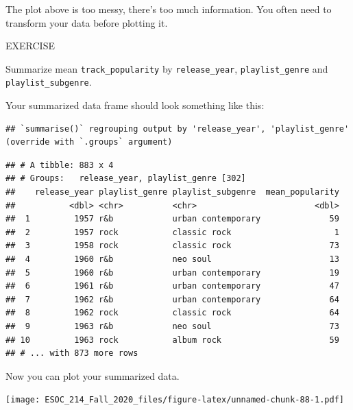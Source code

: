 \documentclass[
]{book}
\newenvironment{Shaded}{\begin{snugshade}}{\end{snugshade}}
\newcommand{\DataTypeTok}[1]{\textcolor[rgb]{0.13,0.29,0.53}{#1}}
\newcommand{\KeywordTok}[1]{\textcolor[rgb]{0.13,0.29,0.53}{\textbf{#1}}}
\newcommand{\NormalTok}[1]{#1}
\newcommand{\OperatorTok}[1]{\textcolor[rgb]{0.81,0.36,0.00}{\textbf{#1}}}
\newcommand{\StringTok}[1]{\textcolor[rgb]{0.31,0.60,0.02}{#1}}
\begin{document}
The plot above is too messy, there's too much information. You often need to transform your data before plotting it.

EXERCISE

Summarize mean \texttt{track\_popularity} by \texttt{release\_year}, \texttt{playlist\_genre} and \texttt{playlist\_subgenre}.

Your summarized data frame should look something like this:

\begin{verbatim}
## `summarise()` regrouping output by 'release_year', 'playlist_genre' (override with `.groups` argument)
\end{verbatim}

\begin{verbatim}
## # A tibble: 883 x 4
## # Groups:   release_year, playlist_genre [302]
##    release_year playlist_genre playlist_subgenre  mean_popularity
##           <dbl> <chr>          <chr>                        <dbl>
##  1         1957 r&b            urban contemporary              59
##  2         1957 rock           classic rock                     1
##  3         1958 rock           classic rock                    73
##  4         1960 r&b            neo soul                        13
##  5         1960 r&b            urban contemporary              19
##  6         1961 r&b            urban contemporary              47
##  7         1962 r&b            urban contemporary              64
##  8         1962 rock           classic rock                    64
##  9         1963 r&b            neo soul                        73
## 10         1963 rock           album rock                      59
## # ... with 873 more rows
\end{verbatim}

Now you can plot your summarized data.

\begin{Shaded}
\end{Shaded}

\texttt{[image: ESOC\_214\_Fall\_2020\_files/figure-latex/unnamed-chunk-88-1.pdf]}
\end{document}

